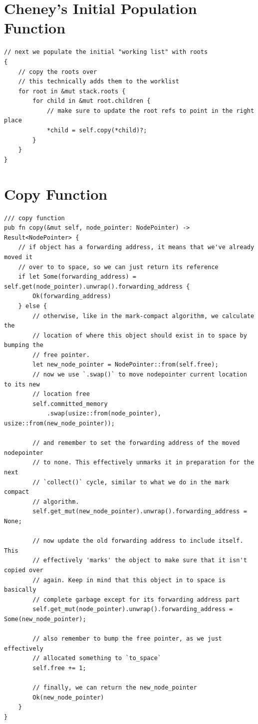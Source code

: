 \documentclass[index]{subfiles}
\begin{document}
\section{Cheney's Initial Population Function}
\begin{verbatim}
// next we populate the initial "working list" with roots
{
    // copy the roots over
    // this technically adds them to the worklist
    for root in &mut stack.roots {
        for child in &mut root.children {
            // make sure to update the root refs to point in the right place
            *child = self.copy(*child)?;
        }
    }
}
\end{verbatim}
\section{Copy Function}
\begin{verbatim}
/// copy function
pub fn copy(&mut self, node_pointer: NodePointer) -> Result<NodePointer> {
    // if object has a forwarding address, it means that we've already moved it
    // over to to space, so we can just return its reference
    if let Some(forwarding_address) = self.get(node_pointer).unwrap().forwarding_address {
        Ok(forwarding_address)
    } else {
        // otherwise, like in the mark-compact algorithm, we calculate the
        // location of where this object should exist in to space by bumping the
        // free pointer.
        let new_node_pointer = NodePointer::from(self.free);
        // now we use `.swap()` to move nodepointer current location to its new
        // location free
        self.committed_memory
            .swap(usize::from(node_pointer), usize::from(new_node_pointer));

        // and remember to set the forwarding address of the moved nodepointer
        // to none. This effectively unmarks it in preparation for the next
        // `collect()` cycle, similar to what we do in the mark compact
        // algorithm.
        self.get_mut(new_node_pointer).unwrap().forwarding_address = None;

        // now update the old forwarding address to include itself. This
        // effectively 'marks' the object to make sure that it isn't copied over
        // again. Keep in mind that this object in to space is basically
        // complete garbage except for its forwarding address part
        self.get_mut(node_pointer).unwrap().forwarding_address = Some(new_node_pointer);

        // also remember to bump the free pointer, as we just effectively
        // allocated something to `to_space`
        self.free += 1;

        // finally, we can return the new_node_pointer
        Ok(new_node_pointer)
    }
}
\end{verbatim}
\end{document}
